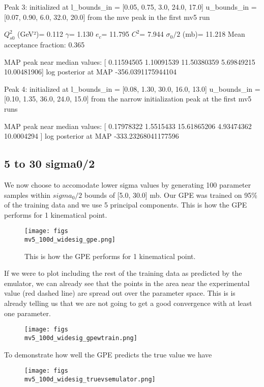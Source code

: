 \documentclass{article}
\begin{document}
Peak 3: initialized at 
l_bounds_in = [0.05, 0.75, 3.0, 24.0, 17.0]
u_bounds_in = [0.07, 0.90, 6.0, 32.0, 20.0]
from the mve peak in the first mv5 run

$Q_{s0}^{2}$ (GeV²)= 0.112
$\gamma$= 1.130
$e_c$= 11.795
$C^{2}$= 7.944
$\sigma_0/2$ (mb)= 11.218
Mean acceptance fraction: 0.365

MAP peak near median values: [ 0.11594505  1.10091539 11.50380359  5.69849215 10.00481906]
log posterior at MAP -356.0391175944104


Peak 4: initialized at
l_bounds_in = [0.08, 1.30, 30.0, 16.0, 13.0]
u_bounds_in = [0.10, 1.35, 36.0, 24.0, 15.0]
from the narrow initialization peak at the first mv5 runs

MAP peak near median values: [ 0.17978322  1.5515433  15.61865206  4.93474362 10.0004294 ]
log posterior at MAP -333.23268041177596

\subsection{5 to 30 sigma0/2}

We now choose to accomodate lower sigma values by generating 100 parameter samples within $ sigma_0/2$ bounds of [5.0, 30.0] mb. Our GPE was trained on 95\% of the training data and we use 5 principal components. This is how the GPE performs for 1 kinematical point. 

\begin{figure}
\centering
\texttt{[image: figs\\mv5\_100d\_widesig\_gpe.png]}
\caption{This is how the GPE performs for 1 kinematical point.}
\label{fig:mv5_100d_widesig_gpe}
\end{figure}

If we were to plot including the rest of the training data as predicted by the emulator, we can already see that the points in the area near the experimental value (red dashed line) are spread out over the parameter space. This is is already telling us that we are not going to get a good convergence with at least one parameter.

\begin{figure}
\centering
\texttt{[image: figs\\mv5\_100d\_widesig\_gpewtrain.png]}
\label{fig:mv5_100d_widesig_gpewtrain}
\end{figure}

To demonstrate how well the GPE predicts the true value we have

\begin{figure}
\centering
\texttt{[image: figs\\mv5\_100d\_widesig\_truevsemulator.png]}
\label{fig:mv5_100d_widesig_truevsemulator}
\end{figure}
\end{document}
